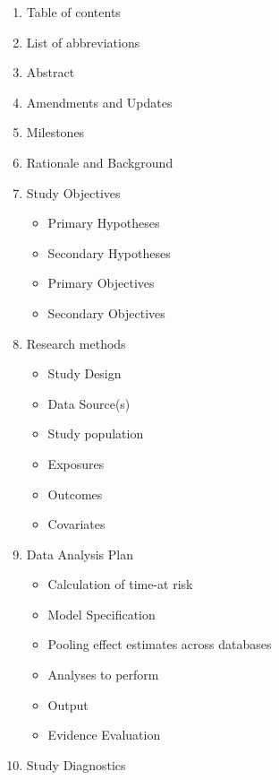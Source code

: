 \documentclass[11pt]{book}
\providecommand{\tightlist}{%
  \setlength{\itemsep}{0pt}\setlength{\parskip}{0pt}}
\theoremstyle{definition}
\theoremstyle{definition}
\theoremstyle{definition}
\theoremstyle{remark}
\begin{document}
\begin{enumerate}
\def\labelenumi{\arabic{enumi}.}
\tightlist
\item
  Table of contents\\
\item
  List of abbreviations\\
\item
  Abstract
\item
  Amendments and Updates\\
\item
  Milestones\\
\item
  Rationale and Background
\item
  Study Objectives

  \begin{itemize}
  \tightlist
  \item
    Primary Hypotheses\\
  \item
    Secondary Hypotheses\\
  \item
    Primary Objectives\\
  \item
    Secondary Objectives\\
  \end{itemize}
\item
  Research methods

  \begin{itemize}
  \tightlist
  \item
    Study Design\\
  \item
    Data Source(s)\\
  \item
    Study population\\
  \item
    Exposures
  \item
    Outcomes\\
  \item
    Covariates\\
  \end{itemize}
\item
  Data Analysis Plan

  \begin{itemize}
  \tightlist
  \item
    Calculation of time-at risk\\
  \item
    Model Specification\\
  \item
    Pooling effect estimates across databases
  \item
    Analyses to perform\\
  \item
    Output\\
  \item
    Evidence Evaluation\\
  \end{itemize}
\item
  Study Diagnostics


\end{enumerate}
\end{document}
